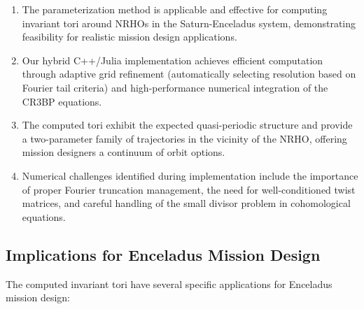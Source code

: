 \documentclass[review,onefignum,onetabnum]{siamart220329}
\begin{document}
\begin{enumerate}
    \item The parameterization method is applicable and effective for computing
          invariant tori around NRHOs in the Saturn-Enceladus system, demonstrating
          feasibility for realistic mission design applications.

    \item Our hybrid C++/Julia implementation achieves efficient computation through
          adaptive grid refinement (automatically selecting resolution based on
          Fourier tail criteria) and high-performance numerical integration of
          the CR3BP equations.

    \item The computed tori exhibit the expected quasi-periodic structure and
          provide a two-parameter family of trajectories in the vicinity of the
          NRHO, offering mission designers a continuum of orbit options.

    \item Numerical challenges identified during implementation include the
          importance of proper Fourier truncation management, the need for
          well-conditioned twist matrices, and careful handling of the small
          divisor problem in cohomological equations.
\end{enumerate}

\subsection{Implications for Enceladus Mission Design}

The computed invariant tori have several specific applications for Enceladus
mission design:
\end{document}
